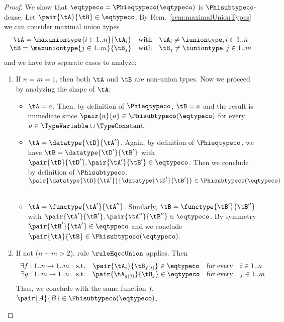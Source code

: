 \begin{proof}
We show that $\mathbin{\eqtypeco} = \Phieqtypeco\!\left(\eqtypeco\right)$ is
$\Phisubtypeco$-dense. Let $\pair{\tA}{\tB} \in \mathbin{\eqtypeco}$. By
Rem.~\ref{rem:maximalUnionTypes} we can consider maximal union types $$
\begin{array}{r@{\quad\text{with}\quad}l}
\tA = \maxuniontype{i \in 1..n}{\tA_i} & \tA_i \neq \iuniontype, i \in 1..n \\
\tB = \maxuniontype{j \in 1..m}{\tB_j} & \tB_j \neq \iuniontype, j \in 1..m
\end{array} $$ and we have two separate cases to analyze:
\begin{enumerate}
  \item If $n = m = 1$, then both $\tA$ and $\tB$ are non-union types. Now we
  proceed by analyzing the shape of $\tA$:
  \begin{itemize}
    \item $\tA = a$. Then, by definition of $\Phieqtypeco$, $\tB = a$ and the
    result is immediate since $\pair{a}{a} \in
    \Phisubtypeco\!\left(\eqtypeco\right)$ for every $a \in \TypeVariable \cup
    \TypeConstant$.
    
    \item $\tA = \datatype{\tD}{\tA'}$. Again, by definition of $\Phieqtypeco$,
    we have $\tB = \datatype{\tD'}{\tB'}$ with $\pair{\tD}{\tD'},
    \pair{\tA'}{\tB'} \in \mathbin{\eqtypeco}$. Then we conclude by definition
    of $\Phisubtypeco$, $\pair{\datatype{\tD}{\tA'}}{\datatype{\tD'}{\tB'}} \in
    \Phisubtypeco\!\left(\eqtypeco\right)$.
    
    \item $\tA = \functype{\tA'}{\tA''}$. Similarly, $\tB =
    \functype{\tB'}{\tB''}$ with $ \pair{\tA'}{\tB'}, \pair{\tA''}{\tB''} \in
    \mathbin{\eqtypeco}$. By symmetry $\pair{\tB'}{\tA'} \in
    \mathbin{\eqtypeco}$ and we conclude $\pair{\tA}{\tB} \in
    \Phisubtypeco\!\left(\eqtypeco\right)$.
  \end{itemize}
  
  \item If not (\ie $n + m > 2$), rule $\ruleEqcoUnion$ applies. Then $$
\begin{array}{r@{\quad\text{s.t.}\quad}c@{\quad\text{for every}\quad}l}
\exists f : 1..n \to 1..m & \pair{\tA_i}{\tB_{f(i)}} \in \mathbin{\eqtypeco} & i \in 1..n \\
\exists g : 1..m \to 1..n & \pair{\tA_{g(j)}}{\tB_j} \in \mathbin{\eqtypeco} & j \in 1..m
\end{array} $$ Thus, we conclude with the same function $f$, $\pair{A}{B}
  \in \Phisubtypeco\!\left(\eqtypeco\right)$.
\end{enumerate}
\end{proof}



